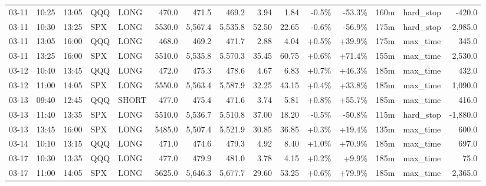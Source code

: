\documentclass[11pt,a4paper,twoside]{article}
\begin{document}
\begin{landscape}
\begin{center}
\begin{longtable}{>{\color{txtmain}}l l l l l r r r r r r r r >{\color{txtmain}}l r}
03-11 & 10:25 & 13:05 & QQQ & LONG & 470.0 & 471.5 & 469.2 & 3.94 & 1.84 & \textcolor{lossred}{-0.5\%} & \textcolor{lossred}{-53.3\%} & 160m & hard\_stop & \textcolor{lossred}{-420.0} \\
03-11 & 10:30 & 13:25 & SPX & LONG & 5530.0 & 5,567.4 & 5,535.8 & 52.50 & 22.65 & \textcolor{lossred}{-0.6\%} & \textcolor{lossred}{-56.9\%} & 175m & hard\_stop & \textcolor{lossred}{-2,985.0} \\
03-11 & 13:05 & 16:00 & QQQ & LONG & 468.0 & 469.2 & 471.7 & 2.88 & 4.04 & \textcolor{wingreen}{+0.5\%} & \textcolor{wingreen}{+39.9\%} & 175m & max\_time & \textcolor{wingreen}{345.0} \\
03-11 & 13:25 & 16:00 & SPX & LONG & 5510.0 & 5,535.8 & 5,570.3 & 35.45 & 60.75 & \textcolor{wingreen}{+0.6\%} & \textcolor{wingreen}{+71.4\%} & 155m & max\_time & \textcolor{wingreen}{2,530.0} \\
03-12 & 10:40 & 13:45 & QQQ & LONG & 472.0 & 475.3 & 478.6 & 4.67 & 6.83 & \textcolor{wingreen}{+0.7\%} & \textcolor{wingreen}{+46.3\%} & 185m & max\_time & \textcolor{wingreen}{432.0} \\
03-12 & 11:00 & 14:05 & SPX & LONG & 5550.0 & 5,563.4 & 5,587.9 & 32.25 & 43.15 & \textcolor{wingreen}{+0.4\%} & \textcolor{wingreen}{+33.8\%} & 185m & max\_time & \textcolor{wingreen}{1,090.0} \\
03-13 & 09:40 & 12:45 & QQQ & SHORT & 477.0 & 475.4 & 471.6 & 3.74 & 5.81 & \textcolor{wingreen}{+0.8\%} & \textcolor{wingreen}{+55.7\%} & 185m & max\_time & \textcolor{wingreen}{416.0} \\
03-13 & 11:40 & 13:35 & SPX & LONG & 5510.0 & 5,536.7 & 5,510.8 & 37.00 & 18.20 & \textcolor{lossred}{-0.5\%} & \textcolor{lossred}{-50.8\%} & 115m & hard\_stop & \textcolor{lossred}{-1,880.0} \\
03-13 & 13:45 & 16:00 & SPX & LONG & 5485.0 & 5,507.4 & 5,521.9 & 30.85 & 36.85 & \textcolor{wingreen}{+0.3\%} & \textcolor{wingreen}{+19.4\%} & 135m & max\_time & \textcolor{wingreen}{600.0} \\
03-14 & 10:10 & 13:15 & QQQ & LONG & 471.0 & 474.6 & 479.3 & 4.92 & 8.40 & \textcolor{wingreen}{+1.0\%} & \textcolor{wingreen}{+70.9\%} & 185m & max\_time & \textcolor{wingreen}{697.0} \\
03-17 & 10:30 & 13:35 & QQQ & LONG & 477.0 & 479.9 & 481.0 & 3.78 & 4.15 & \textcolor{wingreen}{+0.2\%} & \textcolor{wingreen}{+9.9\%} & 185m & max\_time & \textcolor{wingreen}{75.0} \\
03-17 & 11:00 & 14:05 & SPX & LONG & 5625.0 & 5,646.3 & 5,677.7 & 29.60 & 53.25 & \textcolor{wingreen}{+0.6\%} & \textcolor{wingreen}{+79.9\%} & 185m & max\_time & \textcolor{wingreen}{2,365.0} \\

\end{longtable}
\end{center}
\end{landscape}
\end{document}
